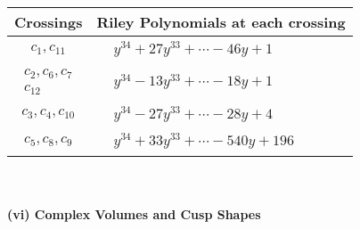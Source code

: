 \documentclass[1p]{elsarticle_modified}
\theoremstyle{definition}
\begin{document}
\begin{tabular}{m{50pt}|m{274pt}}
Crossings & \hspace{64pt}Riley Polynomials at each crossing \\
\hline $$\begin{aligned}c_{1},c_{11}\end{aligned}$$&$\begin{aligned}
&y^{34}+27 y^{33}+\cdots-46 y+1
\end{aligned}$\\
\hline $$\begin{aligned}c_{2},c_{6},c_{7}\\c_{12}\end{aligned}$$&$\begin{aligned}
&y^{34}-13 y^{33}+\cdots-18 y+1
\end{aligned}$\\
\hline $$\begin{aligned}c_{3},c_{4},c_{10}\end{aligned}$$&$\begin{aligned}
&y^{34}-27 y^{33}+\cdots-28 y+4
\end{aligned}$\\
\hline $$\begin{aligned}c_{5},c_{8},c_{9}\end{aligned}$$&$\begin{aligned}
&y^{34}+33 y^{33}+\cdots-540 y+196
\end{aligned}$\\
\hline
\end{tabular}\\~\\
\newpage\flushleft \textbf{(vi) Complex Volumes and Cusp Shapes}
\end{document}
